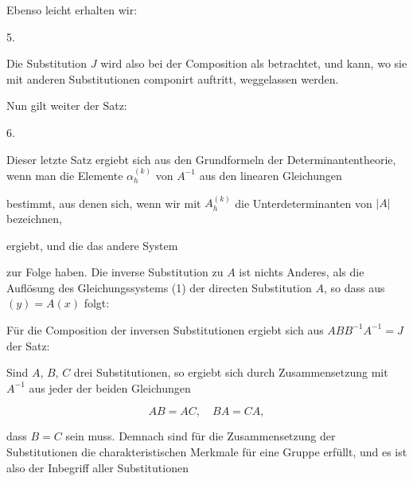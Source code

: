 Ebenso leicht erhalten wir:

\par
5.\enspace{}

Die Substitution $J$ wird also bei der Composition als  betrachtet, und kann, wo sie mit anderen Substitutionen componirt auftritt, weggelassen werden.

Nun gilt weiter der Satz:

\par
6.\enspace{}



Dieser letzte Satz ergiebt sich aus den Grundformeln der Determinantentheorie, wenn man die Elemente $\alpha_h^{(k)}$ von $A^{-1}$ aus den linearen Gleichungen


bestimmt, aus denen sich, wenn wir mit $A_h^{(k)}$ die Unterdeterminanten von $|A|$ bezeichnen,


ergiebt, und die das andere System


zur Folge haben. Die inverse Substitution zu $A$ ist nichts Anderes, als die Auflösung des Gleichungssystems (1) der directen Substitution $A$, so dass aus $(y) = A(x)$ folgt:


Für die Composition der inversen Substitutionen ergiebt sich aus $ABB^{-1}A^{-1} = J$ der Satz:


Sind $A$, $B$, $C$ drei Substitutionen, so ergiebt sich durch Zusammensetzung mit $A^{-1}$ aus jeder der beiden Gleichungen

\[
AB = AC, \quad BA = CA,
\]

dass $B = C$ sein muss. Demnach sind für die Zusammensetzung der Substitutionen die charakteristischen Merkmale für eine Gruppe erfüllt, und es ist also der Inbegriff aller Substitutionen
